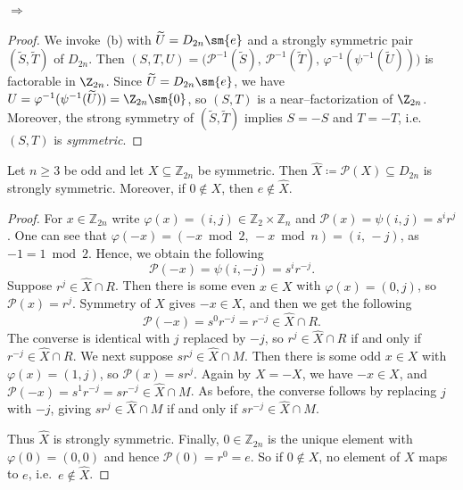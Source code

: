 \documentclass{file}
\begin{document}
\begin{cor}\label{cor:ours-implies-KPS8}
 $\Rightarrow$~
\end{cor}

\begin{proof}
We invoke~(b) with 
$\widetilde U=D_{2n}\sm \{e\}$ and a strongly symmetric pair
$(\widetilde S,\widetilde T)$ of $D_{2n}$.
Then $(S,T,U)=\bigl(\mathcal P^{-1}(\widetilde S),\,\mathcal P^{-1}(\widetilde T),\,
\varphi^{-1}(\psi^{-1}(\widetilde U))\bigr)$ is factorable in $\Z_{2n}$.
Since $\widetilde U=D_{2n}\sm \{e\}$, we have
$U=\varphi^{-1}(\psi^{-1}(\widetilde U))=\Z_{2n}\sm \{0\}$, so $(S,T)$ is a near–factorization of
$\Z_{2n}$. Moreover, the strong symmetry of $(\widetilde S,\widetilde T)$ implies
$S=-S$ and $T=-T$, i.e.\ $(S,T)$ is \emph{symmetric}.
\end{proof}

\begin{lem}\label{lem:symmetric-to-strongly-symmetric}
Let $n\ge3$ be odd and let $X\subseteq \mathbb Z_{2n}$ be symmetric.
Then $\widehat X\coloneqq\mathcal P(X)\subseteq D_{2n}$ is strongly symmetric.
Moreover, if $0\notin X$, then $e\notin\widehat X$.
\end{lem}

\begin{proof}
For $x\in\mathbb Z_{2n}$ write $\varphi(x)=(i,j)\in\mathbb Z_2\times\mathbb Z_n$ and $\mathcal P(x)=\psi(i,j)=s^i r^j$.
One can see that
$\varphi(-x) = (-x\bmod2,\,-x\bmod n)= (i,\,-j)$, as $-1= 1 \bmod2$.
Hence, we obtain the following
\[
\mathcal P(-x) = \psi(i,-j) = s^i r^{-j}.
\] 
Suppose $r^j\in\widehat X\cap R$. Then there is some even $x\in X$ with
  $\varphi(x)=(0,j)$, so $\mathcal P(x)=r^j$.  
  Symmetry of $X$ gives $-x\in X$, and then we get the following
  \[
  \mathcal P(-x)=s^0 r^{-j} = r^{-j}\in\widehat X\cap R.
  \]
  The converse is identical with $j$ replaced by $-j$, so
  $r^j\in\widehat X\cap R$ if and only if  $r^{-j}\in\widehat X\cap R$.
We next suppose $sr^j\in\widehat X\cap M$. Then there is some odd $x\in X$ with
  $\varphi(x)=(1,j)$, so $\mathcal P(x)=sr^j$.  
  Again by $X=-X$, we have $-x\in X$, and
  $\mathcal P(-x)=s^1 r^{-j} = s r^{-j}\in\widehat X\cap M$.
  As before, the converse follows by replacing $j$ with $-j$, giving
  $sr^j\in\widehat X\cap M$ if and only if $sr^{-j}\in\widehat X\cap M$.

Thus $\widehat X$ is strongly symmetric.
Finally, $0\in\mathbb Z_{2n}$ is the unique element with
$\varphi(0)=(0,0)$ and hence $\mathcal P(0)=r^0=e$.
So if $0\notin X$, no element of $X$ maps to $e$, i.e.\ $e\notin\widehat X$.
\end{proof}
\end{document}
